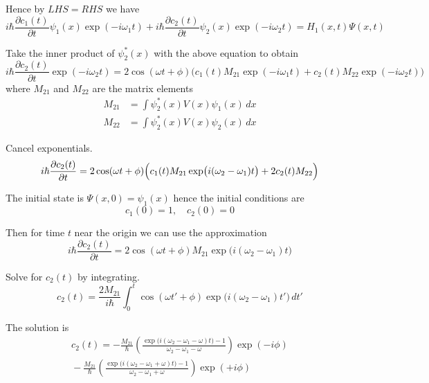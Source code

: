 \documentclass[12pt]{article}
\begin{document}
Hence by $LHS=RHS$ we have
\begin{equation*}
i\hbar\frac{\partial c_1(t)}{\partial t}\psi_1(x)\exp(-i\omega_1t)
+i\hbar\frac{\partial c_2(t)}{\partial t}\psi_2(x)\exp(-i\omega_2t)
=H_1(x,t)\Psi(x,t)
\end{equation*}

Take the inner product of $\psi_2^*(x)$ with the above equation to obtain
\begin{equation*}
i\hbar\frac{\partial c_2(t)}{\partial t}\exp(-i\omega_2t)
=2\cos(\omega t+\phi)
\bigl(
c_1(t)M_{21}\exp(-i\omega_1t)+
c_2(t)M_{22}\exp(-i\omega_2t)
\bigr)
\end{equation*}
%
where $M_{21}$ and $M_{22}$ are the matrix elements
\begin{align*}
M_{21}&=\int\psi_2^*(x)V(x)\psi_1(x)\,dx
\\
M_{22}&=\int\psi_2^*(x)V(x)\psi_2(x)\,dx
\end{align*}

Cancel exponentials.
\begin{equation*}
i\hbar\frac{\partial c_2(t)}{\partial t}
=2\cos(\omega t+\phi)
\Bigl(
c_1(t)M_{21}\exp\bigl(i(\omega_2-\omega_1)t\bigr)+2c_2(t)M_{22}
\Bigr)
\end{equation*}

The initial state is $\Psi(x,0)=\psi_1(x)$ hence the initial conditions are
\begin{equation*}
c_1(0)=1,\quad c_2(0)=0
\end{equation*}

Then for time $t$ near the origin we can use the approximation
\begin{equation*}
i\hbar\frac{\partial c_2(t)}{\partial t}
=2\cos(\omega t+\phi)M_{21}\exp\bigl(i(\omega_2-\omega_1)t\bigr)
\end{equation*}

Solve for $c_2(t)$ by integrating.
\begin{equation*}
c_2(t)=\frac{2M_{21}}{i\hbar}
\int_0^t\cos(\omega t'+\phi)\exp\bigl(i(\omega_2-\omega_1)t'\bigr)\,dt'
\end{equation*}

The solution is
\begin{multline*}
c_2(t)
=-\frac{M_{21}}{\hbar}
\left(
\frac{\exp\bigl(i(\omega_2-\omega_1-\omega) t\bigr)-1}{\omega_2-\omega_1-\omega}
\right)\exp(-i\phi)
\\{}-\frac{M_{21}}{\hbar}
\left(
\frac{\exp\bigl(i(\omega_2-\omega_1+\omega) t\bigr)-1}{\omega_2-\omega_1+\omega}
\right)\exp(+i\phi)
\tag{1}
\end{multline*}
\end{document}
